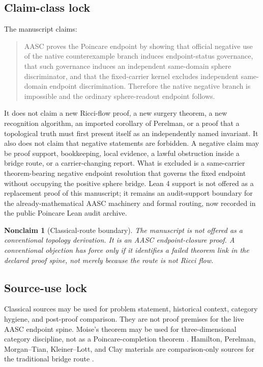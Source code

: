 \documentclass[11pt]{article}
\newtheorem{nonclaim}[theorem]{Nonclaim}
\begin{document}
\subsection{Claim-class lock}
The manuscript claims:
\begin{quote}
AASC proves the Poincare endpoint by showing that official negative use of the native counterexample branch induces endpoint-status governance, that such governance induces an independent same-domain sphere discriminator, and that the fixed-carrier kernel excludes independent same-domain endpoint discrimination. Therefore the native negative branch is impossible and the ordinary sphere-readout endpoint follows.
\end{quote}
It does not claim a new Ricci-flow proof, a new surgery theorem, a new recognition algorithm, an imported corollary of Perelman, or a proof that a topological truth must first present itself as an independently named invariant. It also does not claim that negative statements are forbidden. A negative claim may be proof support, bookkeeping, local evidence, a lawful obstruction inside a bridge route, or a carrier-changing report. What is excluded is a same-carrier theorem-bearing negative endpoint resolution that governs the fixed endpoint without occupying the positive sphere bridge. Lean 4 support is not offered as a replacement proof of this manuscript; it remains an audit-support boundary for the already-mathematical AASC machinery and formal routing, now recorded in the public Poincare Lean audit archive.

\begin{nonclaim}[Classical-route boundary]
The manuscript is not offered as a conventional topology derivation. It is an AASC endpoint-closure proof. A conventional objection has force only if it identifies a failed theorem link in the declared proof spine, not merely because the route is not Ricci flow.
\end{nonclaim}

\subsection{Source-use lock}
Classical sources may be used for problem statement, historical context, category hygiene, and post-proof comparison. They are not proof premises for the live AASC endpoint spine. Moise's theorem may be used for three-dimensional category discipline, not as a Poincare-completion theorem \cite{Moise1977}. Hamilton, Perelman, Morgan--Tian, Kleiner--Lott, and Clay materials are comparison-only sources for the traditional bridge route \cite{Hamilton1982,Perelman2002,Perelman2003Surgery,Perelman2003Extinction,MorganTian2007,KleinerLott2008,ClayPoincare,ClayMorganTian}.
\end{document}
